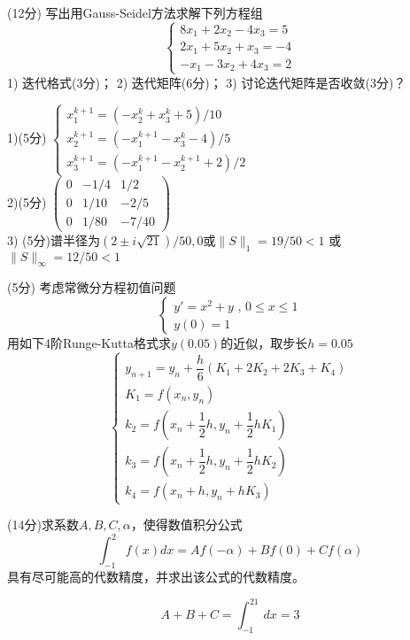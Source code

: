 \documentclass[12pt,letter]{ustcexam}
\begin{document}
\begin{problems}
\newpage
\qu (12分)  写出用Gauss-Seidel方法求解下列方程组
$$\begin {cases} 8x_1+2x_2-4x_3=5\\ 2 x_1+5x_2+ x_3=-4 \\ -x_1-3x_2+4x_3=2
\end{cases}$$
1) 迭代格式(3分)；  2) 迭代矩阵(6分)； 3) 讨论迭代矩阵是否收敛(3分)？
\begin{sol}
1)(5分)
$
\left\{\begin{array}{l}
x_1^{k+1}=(-x_2^k+x_3^k+5)/10 \\
x_2^{k+1}=(-x_1^{k+1}-x_3^k-4)/5 \\
x_3^{k+1}=(-x_1^{k+1}-x_2^{k+1}+2)/2
\end{array}\right.
$ \\
2)(5分)
$
\left(\begin{array}{ccc}
0 & -1/4 & 1/2 \\
0 & 1/10 & -2/5 \\
0 & 1/80 & -7/40
\end{array}\right)
$ \\
3) (5分)谱半径为$(2\pm i\sqrt{21})/50,0$或$\|S\|_1=19/50<1$
   或$\|S\|_{\infty}=12/50<1$
\end{sol}

\newpage

\qu (5分) 考虑常微分方程初值问题
$$ \left\{\begin{array}{l}y'=x^2+y \mbox{  ,  } 0\leqslant x\leqslant 1 \\
y(0)=1
\end{array}\right.$$
用如下4阶Runge-Kutta格式求$y(0.05)$的近似，取步长$h=0.05$
$$
\left\{\begin{array}{l}
y_{n+1}=y_n+\dfrac{h}{6}(K_1+2K_2+2K_3+K_4) \\
K_1=f(x_n,y_n) \\
k_2=f(x_n+\dfrac{1}{2}h,y_n+\dfrac{1}{2}hK_1) \\
k_3=f(x_n+\dfrac{1}{2}h,y_n+\dfrac{1}{2}hK_2) \\
k_4=f(x_n+h,y_n+hK_3)
\end{array}\right.
$$


\vspace*{0.25\textheight}

\newpage

\qu (14分)求系数$A,B,C,\alpha$，使得数值积分公式
$$
  \int_{-1}^2f(x)dx=Af(-\alpha)+Bf(0)+Cf(\alpha)
$$
具有尽可能高的代数精度，并求出该公式的代数精度。
\begin{sol}
$$
A+B+C=\int_{-1}^21dx=3
$$
\end{sol}

\newpage

\end{problems}


\clearpage
{}
\clearpage

\end{document}
